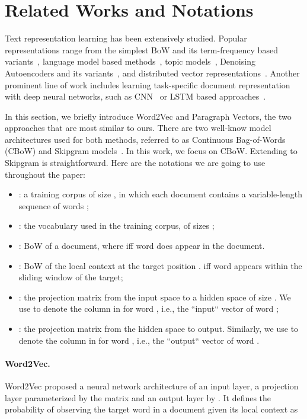 \documentclass{article} \usepackage{iclr2017_conference,times}
\begin{document}
\section{Related Works and Notations}

Text representation learning has been extensively studied. Popular representations range from the simplest BoW and its term-frequency based variants~\citep{salton1988term}, language model based methods~\citep{croft2013language,mikolov2010recurrent,kim2015character}, topic models~\citep{deerwester1990indexing,blei2003latent}, Denoising Autoencoders and its variants~\citep{vincent2008extracting,chen2012marginalized}, and distributed vector representations~\citep{mesnil2014ensemble,le2014distributed,kiros2015skip}. Another prominent line of work includes learning task-specific document representation with deep neural networks, such as CNN~\citep{zhang2015text} or LSTM based approaches~\citep{tai2015improved,dai2015semi}. 

In this section, we briefly introduce Word2Vec and Paragraph Vectors, the two approaches that are most similar to ours. There are two well-know model architectures used for both methods, referred to as Continuous Bag-of-Words (CBoW) and Skipgram models~\citep{mikolov2013efficient}. In this work, we focus on CBoW. Extending to Skipgram is straightforward. Here are the notations we are going to use throughout the paper:
\begin{itemize}[leftmargin=*]
\item[] : a training corpus of size , in which each document  contains a variable-length sequence of words ; 
\item[] : the vocabulary used in the training corpus, of sizes ;
\item[] :  BoW of a document, where  iff word  does appear in the document. 
\item[] : BoW of the local context  at the target position .  iff word  appears within the sliding window of the target;
\item[] : the projection matrix from the input space to a hidden space of size . We use  to denote the column in  for word , i.e., the ``input`` vector of word ;
\item[] : the projection matrix from the hidden space to output. Similarly, we use  to denote the column in  for word , i.e., the ``output`` vector of word .
\end{itemize}


\paragraph{Word2Vec.}
\label{sec:word2vec}
Word2Vec proposed a neural network architecture of an input layer, a projection layer parameterized by the matrix  and an output layer by . It defines the probability of observing the target word  in a document  given its local context  as 
\end{document}
